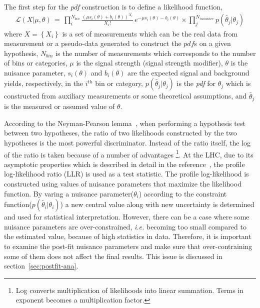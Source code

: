 %
The first step for the \textit{pdf} construction is to define 
a likelihood function,  
\begin{eqnarray} 
\mathcal{L} ( X | \mu, \theta) 
\, = \,
\prod_{i}^{N_{bin}} \frac{ \left( \mu s_i(\theta) + b_i(\theta) \right)^{X_i}}{X_i!} 
\, e^{ - \mu s_i(\theta) - b_i(\theta) }   \times
\prod_{j}^{N_{nuisance}} p\left( \tilde{\theta_j} | \theta_j \right)
\end{eqnarray}
where $X=\left\{X_i\right\}$ is a set of measurements which can be   
the real data from measurement or a pseudo-data generated 
to construct the $pdf$s on a given hypothesis, $N_{bin}$ is the number of 
measurements which corresponds to the number of bins or categories, 
$\mu$ is the signal strength (signal strength modifier),
$\theta$ is the nuisance parameter, 
$s_i(\theta)$ and $b_i(\theta)$ are the expected signal and background 
yields, respectively, in the $i^{th}$ bin or category,
$p\left( \tilde{\theta_j} | \theta_j \right)$ is the \textit{pdf} for 
$\theta_j$ which is constructed from auxiliary measurements or some theoretical  
assumptions, and $\tilde{\theta_j}$ is the measured or assumed value of $\theta$. 

%
According to the Neyman-Pearson lemma~\cite{neymanpearson}, 
when performing a hypothesis test between two hypotheses,
the ratio of two likelihoods constructed by the two hypotheses
is the most powerful discriminator. Instead of the ratio itself, 
the log of the ratio is taken because of a number of advantages
\footnote{Log converts multiplication of likelihoods into linear summation. 
Terms in exponent becomes a multiplication factor.}.  
At the LHC, due to its asymptotic properties which is described in detail 
in the reference~\cite{cowan_asimov}, 
the profile log-likelihood ratio (LLR) is used as a test statistic.    
The profile log-likelihood is constructed using values of nuisance parameters 
that maximize the likelihood function. By varing a nuisance parameter($\theta_i$)
according to the constraint function($p\left( \tilde{\theta_i} | \theta_i \right)$) 
a new central value along with new uncertainty is determined and used 
for statistical interpretation. However, there can be a case where 
some nuisance parameters are over-constrained, \textit{i.e.} becoming too 
small compared to the estimated value, because of high statistics in data. 
Therefore, it is important to examine the post-fit nuisance parameters 
and make sure that over-contraining some of them does not affect the final 
results. This issue is discussed in section~\ref{sec:postfit-ana}.

